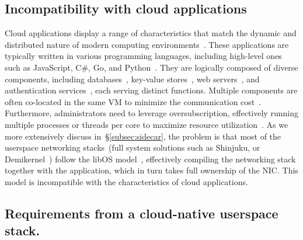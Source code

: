\subsection{Incompatibility with cloud applications}
\label{subsec:cloud-apps}
Cloud applications display a range of characteristics that match the dynamic and distributed nature of modern computing environments~\cite{cortez2017resource}.
These applications are typically written in various programming languages, including high-level ones such as JavaScript, C\#, Go, and Python~\cite{scio-net, meta-microservices}.
They are logically composed of diverse components, including databases~\cite{Chardonnay2023OSDI}, key-value stores~\cite{memcached, memcached-meta}, web servers~\cite{CaddyGitHub}, and authentication services~\cite{HashiCorpVault}, each serving distinct functions.
Multiple components are often co-located in the same VM to minimize the communication cost~\cite{ibench-interference}.
Furthermore, administrators need to leverage oversubscription, effectively running multiple processes or threads per core to maximize resource utilization~\cite{cortez2017resource}.
As we more extensively discuss in~\S\ref{subsec:sidecar}, the problem is that most of the userspace networking stacks~(full system solutions such as Shinjuku, or Demikernel~\cite{shinjuku, demi-kernel}) follow the libOS model~\cite{erpc, cornflakes, mtcp}, effectively compiling the networking stack together with the application, which in turn takes full ownership of the NIC.
This model is incompatible with the characteristics of cloud applications.


\vspace{0.1in}
\noindent{}

\subsection{Requirements from a cloud-native userspace stack.}
\label{sec:requirements}

